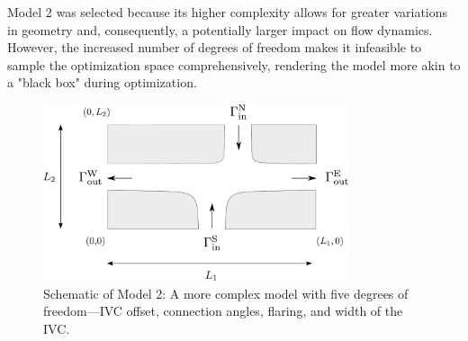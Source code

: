 Model 2 was selected because its higher complexity allows for greater variations in geometry and, consequently, a potentially larger impact on flow dynamics. However, the increased number of degrees of freedom makes it infeasible to sample the optimization space comprehensively, rendering the model more akin to a "black box" during optimization.

\begin{figure}[H]
	\centering
	\includegraphics[width=0.8\textwidth]{figures/krizovatka-obecna.pdf} %
	\caption[Complex Geometric Model]{Schematic of Model 2: A more complex model with five degrees of freedom—IVC offset, connection angles, flaring, and width of the IVC.}
	\label{fig:model2_schematic}
\end{figure}
